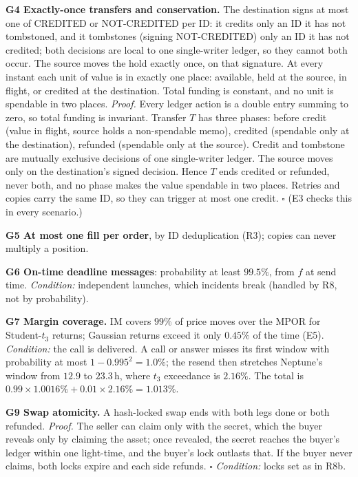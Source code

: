 \documentclass[11pt]{article}
\theoremstyle{definition}
\theoremstyle{remark}
\newcommand{\h}{\,\mathrm{h}}
\begin{document}
\textbf{G4 Exactly-once transfers and conservation.} The destination signs at most one of CREDITED or NOT-CREDITED per ID: it credits only an ID it has not tombstoned, and it tombstones (signing NOT-CREDITED) only an ID it has not credited; both decisions are local to one single-writer ledger, so they cannot both occur. The source moves the hold exactly once, on that signature. At every instant each unit of value is in exactly one place: available, held at the source, in flight, or credited at the destination. Total funding is constant, and no unit is spendable in two places. \emph{Proof.} Every ledger action is a double entry summing to zero, so total funding is invariant. Transfer $T$ has three phases: before credit (value in flight, source holds a non-spendable memo), credited (spendable only at the destination), refunded (spendable only at the source). Credit and tombstone are mutually exclusive decisions of one single-writer ledger. The source moves only on the destination's signed decision. Hence $T$ ends credited or refunded, never both, and no phase makes the value spendable in two places. Retries and copies carry the same ID, so they can trigger at most one credit. $\square$ (E3 checks this in every scenario.)

\textbf{G5 At most one fill per order}, by ID deduplication (R3); copies can never multiply a position.

\textbf{G6 On-time deadline messages}: probability at least $99.5\%$, from $f$ at send time. \emph{Condition:} independent launches, which incidents break (handled by R8, not by probability).

\textbf{G7 Margin coverage.} IM covers $99\%$ of price moves over the MPOR for Student-$t_3$ returns; Gaussian returns exceed it only $0.45\%$ of the time (E5). \emph{Condition:} the call is delivered. A call or answer misses its first window with probability at most $1-0.995^2=1.0\%$; the resend then stretches Neptune's window from $12.9$ to $23.3\h$, where $t_3$ exceedance is $2.16\%$. The total is $0.99\times1.0016\%+0.01\times2.16\%=1.013\%$.

\textbf{G9 Swap atomicity.} A hash-locked swap ends with both legs done or both refunded. \emph{Proof.} The seller can claim only with the secret, which the buyer reveals only by claiming the asset; once revealed, the secret reaches the buyer's ledger within one light-time, and the buyer's lock outlasts that. If the buyer never claims, both locks expire and each side refunds. $\square$ \emph{Condition:} locks set as in R8b.
\end{document}
